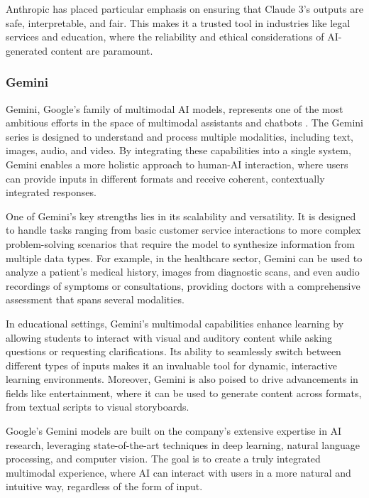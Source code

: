 Anthropic has placed particular emphasis on ensuring that Claude 3's outputs are safe, interpretable, and fair. 
This makes it a trusted tool in industries like legal services and education, where the reliability and ethical considerations of AI-generated content are paramount.

\subsubsection{Gemini}

Gemini, Google's family of multimodal AI models, represents one of the most ambitious efforts in the space of multimodal assistants and chatbots \cite{google2023gemini}. 
The Gemini series is designed to understand and process multiple modalities, including text, images, audio, and video. 
By integrating these capabilities into a single system, Gemini enables a more holistic approach to human-AI interaction, where users can provide inputs in different formats and receive coherent, contextually integrated responses.

One of Gemini's key strengths lies in its scalability and versatility. 
It is designed to handle tasks ranging from basic customer service interactions to more complex problem-solving scenarios that require the model to synthesize information from multiple data types. 
For example, in the healthcare sector, Gemini can be used to analyze a patient's medical history, images from diagnostic scans, and even audio recordings of symptoms or consultations, providing doctors with a comprehensive assessment that spans several modalities.

In educational settings, Gemini's multimodal capabilities enhance learning by allowing students to interact with visual and auditory content while asking questions or requesting clarifications. 
Its ability to seamlessly switch between different types of inputs makes it an invaluable tool for dynamic, interactive learning environments. 
Moreover, Gemini is also poised to drive advancements in fields like entertainment, where it can be used to generate content across formats, from textual scripts to visual storyboards.

Google's Gemini models are built on the company's extensive expertise in AI research, leveraging state-of-the-art techniques in deep learning, natural language processing, and computer vision. 
The goal is to create a truly integrated multimodal experience, where AI can interact with users in a more natural and intuitive way, regardless of the form of input.

